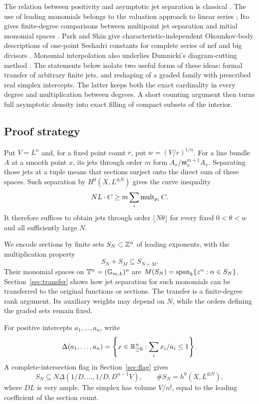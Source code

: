 The relation between positivity and asymptotic jet separation is
classical \cite[Theorem~6.4]{Demailly1992}. The use of leading monomials
belongs to the valuation approach to linear series
\cite{Okounkov1996,LazarsfeldMustata2009,KavehKhovanskii2012};
Ito gives finite-degree comparisons between multipoint jet separation
and initial monomial spaces \cite[Proposition~5.7 and Theorem~5.8]{Ito2013}.
Park and Shin give characteristic-independent Okounkov-body descriptions
of one-point Seshadri constants for complete series of nef and big
divisors \cite[Theorem~1.2(1)]{ParkShin2021}.
Monomial interpolation also underlies Dumnicki's diagram-cutting method
\cite[Proposition~13 and Theorem~14]{Dumnicki2007}.
The statements below isolate two useful forms of these ideas: formal
transfer of arbitrary finite jets, and reshaping of a graded family with
prescribed real simplex intercepts. The latter keeps both the exact
cardinality in every degree and multiplication between degrees. A short
counting argument then turns full asymptotic density into exact filling
of compact subsets of the interior.

\subsection{Proof strategy}

Put $V=L^n$ and, for a fixed point count $r$, put $w=(V/r)^{1/n}$.
For a line bundle $A$ at a smooth point $x$, its jets through order $m$
form $A_x/\mathfrak m_x^{m+1}A_x$. Separating those jets at a tuple
means that sections surject onto the direct sum of these spaces. Such
separation by $H^0(X,L^{\otimes N})$ gives the curve inequality
\[
 NL\cdot C\ge m\sum_i\operatorname{mult}_{p_i}C.
\]
It therefore suffices to obtain jets through order $\lfloor N\theta\rfloor$
for every fixed $0<\theta<w$ and all sufficiently large $N$.

We encode sections by finite sets $S_N\subset\mathbb Z^n$ of leading exponents,
with the multiplication property
\[
 S_N+S_M\subseteq S_{N+M}.
\]
Their monomial spaces on $\mathbb T^n=(\mathbb G_{m,k})^n$ are
$M(S_N)=\operatorname{span}_k\{z^\alpha:\alpha\in S_N\}$.
Section~\ref{sec:transfer} shows how jet separation for such monomials
can be transferred to the original functions or sections. The transfer
is a finite-degree rank argument. Its auxiliary weights may depend on
$N$, while the orders defining the graded sets remain fixed.

For positive intercepts $a_1,\ldots,a_n$, write
\[
 \Delta(a_1,\ldots,a_n)
 =\left\{x\in\mathbb R_{\ge0}^n:\sum_i x_i/a_i\le1\right\}.
\]
A complete-intersection flag in Section~\ref{sec:flag} gives
\[
 S_N\subseteq N\Delta(1/D,\ldots,1/D,D^{n-1}V),
 \qquad \#S_N=h^0(X,L^{\otimes N}),
\]
where $DL$ is very ample. The simplex has volume $V/n!$, equal to the
leading coefficient of the section count.

